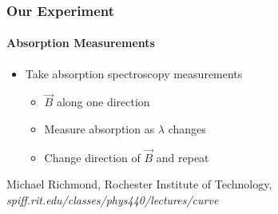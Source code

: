 \documentclass{beamer}
\begin{document}
\begin{frame}
  \frametitle{Our Experiment}
  \framesubtitle{Absorption Measurements}
  \begin{itemize}
	\item Take absorption spectroscopy measurements
	  \begin{itemize}
		\item $\vec B$ along one direction
		\item Measure absorption as $\lambda$ changes
		\item Change direction of $\vec B$ and repeat
	  \end{itemize}
  \end{itemize}
  \begin{center}
  \end{center}
  {\tiny Michael Richmond, Rochester Institute of Technology, \textit{spiff.rit.edu/classes/phys440/lectures/curve}}
\end{frame}
\end{document}
